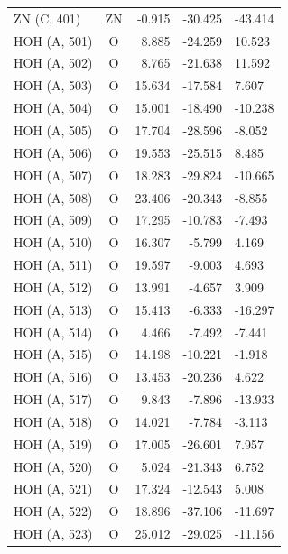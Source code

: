 \begin{longtable}{@{}lcrr@{}}
  ZN (C, 401) & ZN & -0.915 & -30.425 & -43.414 \\
  \cmidrule(r){1-5}
  HOH (A, 501) & O & 8.885 & -24.259 & 10.523 \\
  \cmidrule(r){1-5}
  HOH (A, 502) & O & 8.765 & -21.638 & 11.592 \\
  \cmidrule(r){1-5}
  HOH (A, 503) & O & 15.634 & -17.584 & 7.607 \\
  \cmidrule(r){1-5}
  HOH (A, 504) & O & 15.001 & -18.490 & -10.238 \\
  \cmidrule(r){1-5}
  HOH (A, 505) & O & 17.704 & -28.596 & -8.052 \\
  \cmidrule(r){1-5}
  HOH (A, 506) & O & 19.553 & -25.515 & 8.485 \\
  \cmidrule(r){1-5}
  HOH (A, 507) & O & 18.283 & -29.824 & -10.665 \\
  \cmidrule(r){1-5}
  HOH (A, 508) & O & 23.406 & -20.343 & -8.855 \\
  \cmidrule(r){1-5}
  HOH (A, 509) & O & 17.295 & -10.783 & -7.493 \\
  \cmidrule(r){1-5}
  HOH (A, 510) & O & 16.307 & -5.799 & 4.169 \\
  \cmidrule(r){1-5}
  HOH (A, 511) & O & 19.597 & -9.003 & 4.693 \\
  \cmidrule(r){1-5}
  HOH (A, 512) & O & 13.991 & -4.657 & 3.909 \\
  \cmidrule(r){1-5}
  HOH (A, 513) & O & 15.413 & -6.333 & -16.297 \\
  \cmidrule(r){1-5}
  HOH (A, 514) & O & 4.466 & -7.492 & -7.441 \\
  \cmidrule(r){1-5}
  HOH (A, 515) & O & 14.198 & -10.221 & -1.918 \\
  \cmidrule(r){1-5}
  HOH (A, 516) & O & 13.453 & -20.236 & 4.622 \\
  \cmidrule(r){1-5}
  HOH (A, 517) & O & 9.843 & -7.896 & -13.933 \\
  \cmidrule(r){1-5}
  HOH (A, 518) & O & 14.021 & -7.784 & -3.113 \\
  \cmidrule(r){1-5}
  HOH (A, 519) & O & 17.005 & -26.601 & 7.957 \\
  \cmidrule(r){1-5}
  HOH (A, 520) & O & 5.024 & -21.343 & 6.752 \\
  \cmidrule(r){1-5}
  HOH (A, 521) & O & 17.324 & -12.543 & 5.008 \\
  \cmidrule(r){1-5}
  HOH (A, 522) & O & 18.896 & -37.106 & -11.697 \\
  \cmidrule(r){1-5}
  HOH (A, 523) & O & 25.012 & -29.025 & -11.156 \\

\end{longtable}
